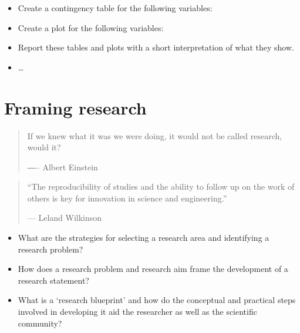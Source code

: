 \documentclass[
  letterpaper,
]{latex/krantz}
\providecommand{\tightlist}{%
  \setlength{\itemsep}{0pt}\setlength{\parskip}{0pt}}\usepackage{longtable,booktabs,array}
\begin{document}
\begin{tcolorbox}[enhanced jigsaw, colframe=quarto-callout-note-color-frame, titlerule=0mm, coltitle=black, colback=white, opacitybacktitle=0.6, colbacktitle=quarto-callout-note-color!10!white, left=2mm, arc=.35mm, leftrule=.75mm, rightrule=.15mm, bottomtitle=1mm, toptitle=1mm, breakable, bottomrule=.15mm, title=\textcolor{quarto-callout-note-color}{\faInfo}\hspace{0.5em}{Technical exercises}, toprule=.15mm, opacityback=0]

\begin{itemize}
\tightlist
\item
  Create a contingency table for the following variables:
\item
  Create a plot for the following variables:
\item
  Report these tables and plots with a short interpretation of what they
  show.
\item
  \ldots{}
\end{itemize}

\end{tcolorbox}

\hypertarget{sec-framing-research}{%
\chapter{Framing research}\label{sec-framing-research}}

\begin{quote}
If we knew what it was we were doing, it would not be called research,
would it?

―-- Albert Einstein
\end{quote}

\begin{quote}
``The reproducibility of studies and the ability to follow up on the
work of others is key for innovation in science and engineering.''

--- Leland Wilkinson
\end{quote}

\begin{tcolorbox}[enhanced jigsaw, colframe=quarto-callout-note-color-frame, titlerule=0mm, coltitle=black, colback=white, opacitybacktitle=0.6, colbacktitle=quarto-callout-note-color!10!white, left=2mm, arc=.35mm, leftrule=.75mm, rightrule=.15mm, bottomtitle=1mm, toptitle=1mm, breakable, bottomrule=.15mm, title=\textcolor{quarto-callout-note-color}{\faInfo}\hspace{0.5em}{Keys}, toprule=.15mm, opacityback=0]

\begin{itemize}
\tightlist
\item
  What are the strategies for selecting a research area and identifying
  a research problem?
\item
  How does a research problem and research aim frame the development of
  a research statement?
\item
  What is a `research blueprint' and how do the conceptual and practical
  steps involved in developing it aid the researcher as well as the
  scientific community?
\end{itemize}

\end{tcolorbox}
\end{document}
